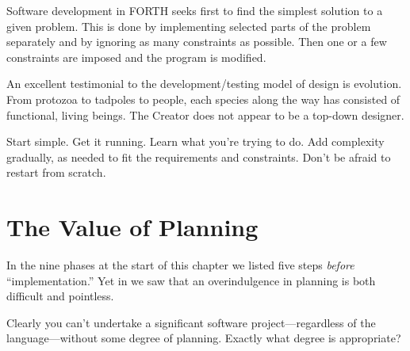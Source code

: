 \begin{tfquot}
Software development in FORTH seeks first to find the simplest solution
to a given problem. This is done by implementing selected parts of the
problem separately and by ignoring as many constraints as possible. Then one
or a few constraints are imposed and the program is modified.
\end{tfquot}
An excellent testimonial to the development/testing model of design is
evolution. From protozoa to tadpoles to people, each species along the
way has consisted of functional, living beings. The Creator does not
appear to be a top-down designer.

\begin{tip}
Start simple. Get it running. Learn what you're trying to do. Add
complexity gradually, as needed to fit the requirements and
constraints. Don't be afraid to restart from scratch.
\end{tip}

\section{The Value of Planning}

In the nine phases at the start of this chapter we listed five steps
\emph{before} ``implementation.'' Yet in  we saw that an
overindulgence in planning is both difficult and pointless.

Clearly you can't undertake a significant software
project---regardless of the language---without some degree of planning.
Exactly what degree is appropriate?

